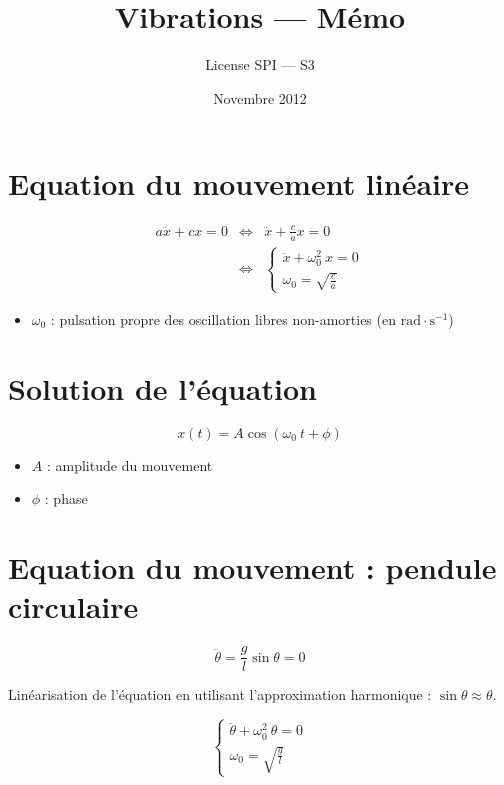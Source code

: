 \documentclass[a4paper, 11pt]{article}
\title{Vibrations — Mémo}
\author{License SPI — S3}
\date{Novembre 2012}
\begin{document}
    \maketitle

\section{Equation du mouvement linéaire}

\begin{eqnarray*}
    a\ddot{x} + cx = 0 & \Leftrightarrow & \ddot{x} + \frac{c}{a}x = 0\\
                       & \Leftrightarrow & \left\{
    \begin{array}{l}
        \ddot{x} + \omega_0^2~x = 0\\
        \omega_0 = \sqrt{\frac{c}{a}}
    \end{array}
\right.  \end{eqnarray*}

\begin{itemize}
    \item $\omega_0$ : pulsation propre des oscillation libres non-amorties (en $\mathrm{rad}\cdot\mathrm{s}^{-1}$)
\end{itemize}

\section{Solution de l'équation}

$$x(t) = A\cos(\omega_0~t + \phi)$$

\begin{itemize}
    \item $A$ : amplitude du mouvement
    \item $\phi$ : phase
\end{itemize}

\section{Equation du mouvement : pendule circulaire}

$$\ddot{\theta} = \frac{g}{l}\sin\theta = 0$$

Linéarisation de l'équation en utilisant l'approximation harmonique : $\sin\theta\approx\theta$.

\[
    \left\{
    \begin{array}{l}
        \ddot{\theta} + \omega_0^2~\theta = 0\\
        \omega_0 = \sqrt{\frac{g}{l}}
    \end{array}
    \right.
\]
\end{document}
